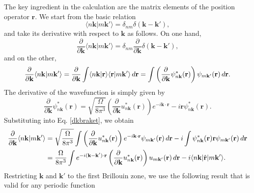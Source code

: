 \documentclass[aps,letterpaper]{revtex4}
\begin{document}
The key ingredient in the calculation are the matrix elements of the position
operator $\mathbf{r}$. We start from the basic relation
\begin{equation}\label{nbraket}
\langle n\mathbf{k}\vert m\mathbf{k}'\rangle =
\delta_{nm}\delta(\mathbf{k} - \mathbf{k}'),
\end{equation}
and take its derivative with respect to $\mathbf{k}$ as follows. On one hand,
\begin{equation}\label{ddk1}
\frac{\partial}{\partial\mathbf{k}}
\langle n\mathbf{k}\vert m\mathbf{k}'\rangle =
\delta_{nm}\frac{\partial}{\partial\mathbf{k}}\delta(\mathbf{k} - \mathbf{k}'),
\end{equation}
and on the other,
\begin{equation}\label{dkbraket}
\frac{\partial}{\partial\mathbf{k}}\langle {n\mathbf{k}} | {m\mathbf{k}'} \rangle
= \frac{\partial}{\partial\mathbf{k}}\int
\langle n\mathbf{k}\vert \mathbf{r}\rangle
\langle \mathbf{r}\vert m\mathbf{k}'\rangle
\,d\mathbf{r} 
= \int
\left(
\frac{\partial}{\partial\mathbf{k}}
\psi^{*}_{n\mathbf{k}}(\mathbf{r})
\right)
\psi_{m\mathbf{k}'}(\mathbf{r})\,d\mathbf{r}.
\end{equation}
The derivative of the wavefunction is simply given by
\begin{equation}\label{dpsi}
\frac{\partial}{\partial\mathbf{k}}\psi^{*}_{n\mathbf{k}}(\mathbf{r})
= \sqrt{\frac{\Omega}{8\pi^{3}}}
\left(
\frac{\partial}{\partial\mathbf{k}}
u^{*}_{n\mathbf{k}}(\mathbf{r})
\right)
e^{-i\mathbf{k}\cdot\mathbf{r}} - i\mathbf{r}\psi^{*}_{n\mathbf{k}}(\mathbf{r}).
\end{equation}
Substituting into Eq. \eqref{dkbraket}, we obtain
\begin{align}\label{dkbraket2}
\frac{\partial}{\partial\mathbf{k}}\langle {n\mathbf{k}} | {m\mathbf{k}'} \rangle
&= \sqrt{\frac{\Omega}{8\pi^{3}}}\int
\left(
\frac{\partial}{\partial\mathbf{k}}
u^{*}_{n\mathbf{k}}(\mathbf{r})\right)e^{-i\mathbf{k}\cdot\mathbf{r}}
\psi_{m\mathbf{k}'}(\mathbf{r})\,d\mathbf{r} 
- i\int\psi^{*}_{n\mathbf{k}}(\mathbf{r})\mathbf{r}
  \psi_{m\mathbf{k}'}(\mathbf{r})\,d\mathbf{r}\nonumber \\
&= \frac{\Omega}{8\pi^{3}}\int
  e^{-i(\mathbf{k}-\mathbf{k}')\cdot\mathbf{r}}
  \left(
  \frac{\partial}{\partial\mathbf{k}}u^{*}_{n\mathbf{k}}(\mathbf{r})
  \right)
u_{m\mathbf{k}'}(\mathbf{r})\,d\mathbf{r}
- i \langle n\mathbf{k} |\hat{\mathbf{r}}| m\mathbf{k}' \rangle.
\end{align}
Restricting $\mathbf{k}$ and $\mathbf{k}'$ to the first Brillouin zone, we use
the following result that is valid for any periodic function
\end{document}

